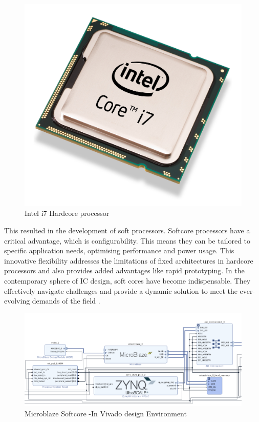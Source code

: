 \documentclass[conference]{IEEEtran}
\begin{document}
\begin{figure}[ht]
\begin{center}
  \includegraphics[scale=0.25]{download37 (1).png}
\end{center}
  \caption{Intel i7 Hardcore processor}
  \label{fig:1}
\end{figure}
This resulted in the development of soft processors. Softcore processors have a critical advantage, which is configurability. This means they can be tailored to specific application needs, optimising performance and power usage. This innovative flexibility addresses the limitations of fixed architectures in hardcore processors and also provides added advantages like rapid prototyping.
In the contemporary sphere of IC design, soft cores have become indispensable. They effectively navigate challenges and provide a dynamic solution to meet the ever-evolving demands of the field \cite{1}.

\begin{figure}[ht]
\begin{center}
  \includegraphics[scale=0.28]{Screenshot 2023-11-01 at 13.41.08 (1).png}
\end{center}
  \caption{Microblaze Softcore -In Vivado design Environment}
  \label{fig:2}
\end{figure}
\end{document}
